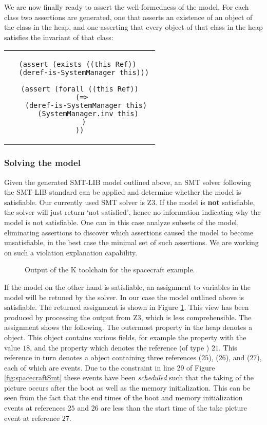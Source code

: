 We are now finally ready to assert the well-formedness of the 
model. For each class two assertions are generated, one that 
asserts an existence of an object of the class in the heap, and one 
asserting that every object of that class in the heap 
satisfies the invariant of that class:

\begin{center}
\begin{tabular}{c}
\begin{lstlisting}
(assert (exists ((this Ref)) 
  (deref-is-SystemManager this)))

(assert (forall ((this Ref))
  (=> 
    (deref-is-SystemManager this) 
    (SystemManager.inv this)
  )
))
\end{lstlisting}
\end{tabular}
\end{center}

\subsubsection{Solving the model}

Given the generated SMT-LIB model outlined above, an SMT
solver following the SMT-LIB standard can be applied and determine 
whether the model is satisfiable. Our currently used SMT solver is
Z3. If the model is {\bf not} satisfiable, the 
solver will just return `not satisfied', hence no information
indicating why the model is not satisfiable. One can in this case
analyze subsets of the model, eliminating assertions to discover
which assertions caused the model to become unsatisfiable, in the best case the minimal set of such assertions. We are working
on such a violation explanation capability.

\begin{figure}
\caption{Output of the K toolchain for the spacecraft example.}
\label{fig:shapes}
\end{figure}

If the model on the other hand is satisfiable, an assignment to variables in the model will be retuned by the solver. In our case the model outlined above is satisfiable. The returned assignment is shown in Figure \ref{fig:shapes}. This view has been produced by
processing the output from Z3, which is less comprehensible.
%
The assignment shows the following. The outermost 
property in the heap denotes a  object. 
This object contains various fields, for example the  
property with the value $18$, and the  property
which denotes the reference (of type ) $21$. This
reference in turn denotes a  object containing
three references  ($25$),  ($26$), and 
 ($27$), each of which are events. Due to the
constraint in line 29 of Figure \ref{fig:spacecraftSmt} these events have been {\em scheduled} such that the taking of the
picture occurs after the boot as well as the memory initialization.
This can be seen from the fact that the end times of the boot and
memory initialization events at references $25$ and $26$ are less than the start time of the take picture event at reference $27$.

\lstset{language=K}

